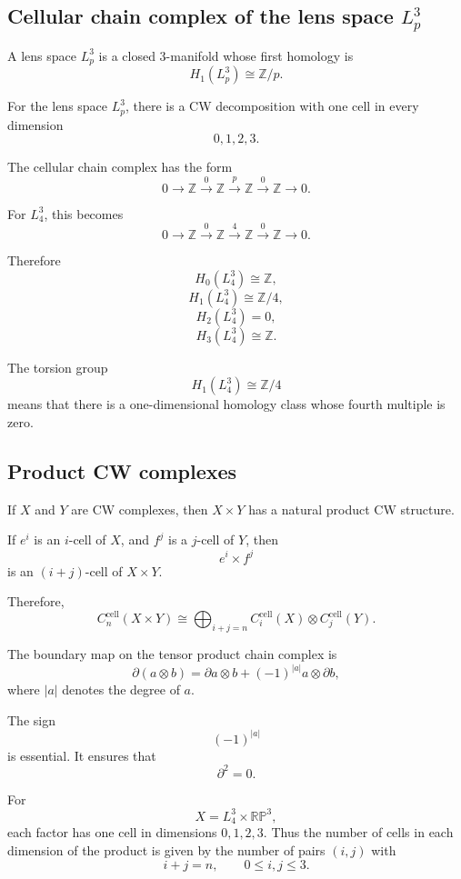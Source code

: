 \documentclass[12pt,a4paper]{article}
\theoremstyle{notespace}
\begin{document}
\subsection{Cellular chain complex of the lens space \(L_p^3\)}

A lens space \(L_p^3\) is a closed \(3\)-manifold whose first homology is
\[
H_1(L_p^3)\cong \mathbb Z/p.
\]

For the lens space \(L_p^3\), there is a CW decomposition with one cell in every dimension
\[
0,1,2,3.
\]

The cellular chain complex has the form
\[
0
\longrightarrow
\mathbb Z
\xrightarrow{0}
\mathbb Z
\xrightarrow{p}
\mathbb Z
\xrightarrow{0}
\mathbb Z
\longrightarrow 0.
\]

For \(L_4^3\), this becomes
\[
0
\longrightarrow
\mathbb Z
\xrightarrow{0}
\mathbb Z
\xrightarrow{4}
\mathbb Z
\xrightarrow{0}
\mathbb Z
\longrightarrow 0.
\]

Therefore
\[
H_0(L_4^3)\cong \mathbb Z,
\]
\[
H_1(L_4^3)\cong \mathbb Z/4,
\]
\[
H_2(L_4^3)=0,
\]
\[
H_3(L_4^3)\cong \mathbb Z.
\]

The torsion group
\[
H_1(L_4^3)\cong \mathbb Z/4
\]
means that there is a one-dimensional homology class whose fourth multiple is zero.

\subsection{Product CW complexes}

If \(X\) and \(Y\) are CW complexes, then \(X\times Y\) has a natural product CW structure.

If \(e^i\) is an \(i\)-cell of \(X\), and \(f^j\) is a \(j\)-cell of \(Y\), then
\[
e^i\times f^j
\]
is an \((i+j)\)-cell of \(X\times Y\).

Therefore,
\[
C_n^{\mathrm{cell}}(X\times Y)
\cong
\bigoplus_{i+j=n}
C_i^{\mathrm{cell}}(X)\otimes C_j^{\mathrm{cell}}(Y).
\]

The boundary map on the tensor product chain complex is
\[
\partial(a\otimes b)
=
\partial a\otimes b
+
(-1)^{|a|}a\otimes \partial b,
\]
where \(|a|\) denotes the degree of \(a\).

The sign
\[
(-1)^{|a|}
\]
is essential. It ensures that
\[
\partial^2=0.
\]

For
\[
X=L_4^3\times \mathbb{RP}^3,
\]
each factor has one cell in dimensions \(0,1,2,3\). Thus the number of cells in each dimension of the product is given by the number of pairs \((i,j)\) with
\[
i+j=n,
\qquad
0\leq i,j\leq 3.
\]
\end{document}
